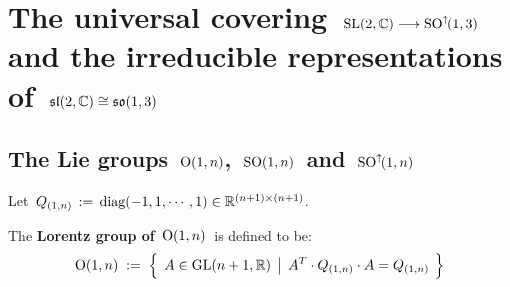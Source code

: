 

\chapter{The universal covering \,$\textnormal{SL}(2,\mathbb{C}) \longrightarrow \textnormal{SO}^{\uparrow\!}(1,3)$\, and
the irreducible representations of \,$\mathfrak{sl}(2,\mathbb{C}) \cong \mathfrak{so}(1,3)$}
\setcounter{theorem}{0}
\setcounter{equation}{0}


\renewcommand{\theenumi}{\roman{enumi}}
\renewcommand{\labelenumi}{\textnormal{(\theenumi)}$\;\;$}


\section{The Lie groups \,$\textnormal{O}(1,n)$,\, $\textnormal{SO}(1,n)$\, and \,$\textnormal{SO}^{\uparrow\!}(1,n)$}



Let \,$Q_{(1,n)} \,:=\, \textnormal{diag}(-1,1,\cdots,1) \in \mathbb{R}^{(n+1) \times (n+1)}$.

\vskip 0.5cm
\begin{definition}[$\textnormal{O}(1,n)$]
\mbox{}
\vskip 0.1cm
\noindent
The \textbf{Lorentz group of \,$\textnormal{O}(1,n)$}\, is defined to be:
\begin{equation*}
\textnormal{O}(1,n)
\; := \;
	\left\{\;\,
		A \overset{{\color{white}.}}{\in} \textnormal{GL}(n+1,\Re)
		\;\left\vert\;\,
			A^{T} \cdot Q_{(1,n)} \cdot A = Q_{(1,n)}
			\right.
		\;\right\}
\end{equation*}
\end{definition}

